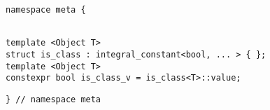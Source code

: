 
\begin{verbatim}
namespace meta {
\end{verbatim}
\begin{verbatim}

template <Object T>
struct is_class : integral_constant<bool, ... > { };
template <Object T>
constexpr bool is_class_v = is_class<T>::value;

\end{verbatim}
\begin{verbatim}
} // namespace meta
\end{verbatim}
